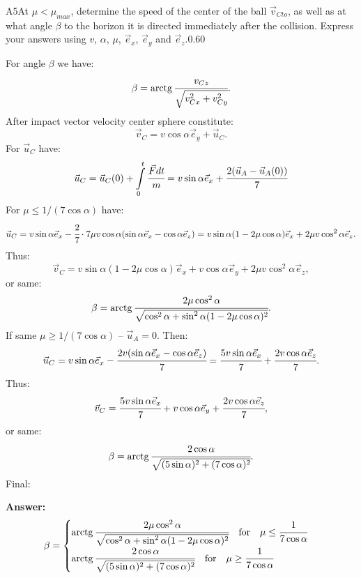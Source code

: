 \documentclass[11pt,a4paper]{article}
\begin{document}
\begin{solcard}{A5}{At $\mu<\mu_{max}$, determine the speed of the center of the ball $\vec{v}_{Cto}$, as well as at what angle $\beta$ to the horizon it is directed immediately after the collision. Express your answers using $v$, $\alpha$, $\mu$, $\vec{e}_x$, $\vec{e}_y$ and $\vec{e}_z$.}{0.60}

For angle $\beta$ we have: $$\beta=\operatorname{arctg}\cfrac{v_{Cz}}{\sqrt{v^2_{Cx}+v^2_{Cy}}}{.} $$After impact vector velocity center sphere constitute: $$\vec{v}_C=v\cos\alpha\vec{e}_y+\vec{u}_C{.} $$For $\vec{u}_C$ have: $$\vec{u}_C=\vec{u}_C(0)+\int\limits_0^t\cfrac{\vec{F}dt}{m}=v\sin\alpha\vec{e}_x+\cfrac{2(\vec{u}_A-\vec{u}_A(0))}{7} $$For $\mu\leq 1/(7\cos\alpha)$ have: $$\vec{u}_C=v\sin\alpha\vec{e}_x-\cfrac{2}{7}\cdot 7\mu v\cos\alpha(\sin\alpha\vec{e}_x-\cos\alpha\vec{e}_z)=v\sin\alpha(1-2\mu\cos\alpha)\vec{e}_x+2\mu v\cos^2\alpha\vec{e}_z{.} $$Thus: $$\vec{v}_C=v\sin\alpha(1-2\mu\cos\alpha)\vec{e}_x+v\cos\alpha\vec{e}_y+2\mu v\cos^2\alpha\vec{e}_z{,} $$or same: $$\beta=\operatorname{arctg}\cfrac{2\mu\cos^2\alpha}{\sqrt{\cos^2\alpha+\sin^2\alpha(1-2\mu\cos\alpha)^2}}{.} $$If same $\mu\geq 1/(7\cos\alpha)$ – $\vec{u}_A=0$. Then: $$\vec{u}_C=v\sin\alpha\vec{e}_x-\cfrac{2v(\sin\alpha\vec{e}_x-\cos\alpha\vec{e}_z)}{7}=\cfrac{5v\sin\alpha\vec{e}_x}{7}+\cfrac{2v\cos\alpha\vec{e}_z}{7}{.} $$Thus: $$\vec{v}_C=\cfrac{5v\sin\alpha\vec{e}_x}{7}+v\cos\alpha\vec{e}_y+\cfrac{2v\cos\alpha\vec{e}_z}{7}{,} $$or same: $$\beta=\operatorname{arctg}\cfrac{2\cos\alpha}{\sqrt{(5\sin\alpha)^2+(7\cos\alpha)^2}}{.} $$Final:

\par\smallskip\noindent\textbf{Answer:} $$\beta=\begin{cases} \operatorname{arctg}\cfrac{2\mu\cos^2\alpha}{\sqrt{\cos^2\alpha+\sin^2\alpha(1-2\mu\cos\alpha)^2}}\quad\text{for}\quad \mu\leq\cfrac{1}{7\cos\alpha}\\ \operatorname{arctg}\cfrac{2\cos\alpha}{\sqrt{(5\sin\alpha)^2+(7\cos\alpha)^2}}\quad\text{for}\quad \mu\geq\cfrac{1}{7\cos\alpha} \end{cases} $$
\end{solcard}
\end{document}
